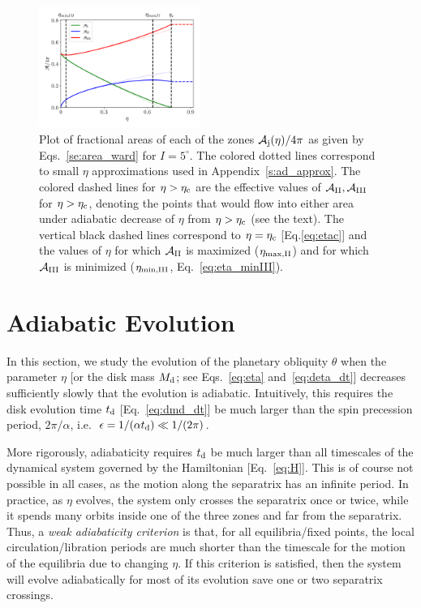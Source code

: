 \documentclass[twocolumn,twocolappendix]{aastex63}
\begin{document}
\begin{figure}
    \centering
    \includegraphics[width=0.47\textwidth]{plots_diskdisp/1_areas.png}
    \caption{Plot of fractional areas of each of the zones
    $\mathcal{A}_{\rm j}(\eta) / 4\pi$ as given by Eqs.~\eqref{se:area_ward}
    for $I = 5^\circ$. The colored dotted lines correspond to
    small $\eta$ approximations used in Appendix~\ref{s:ad_approx}. The colored
    dashed lines for $\eta > \eta_{\rm c}$ are the effective values of
    $\mathcal{A}_{\rm II}, \mathcal{A}_{\rm III}$ for $\eta > \eta_{\rm c}$,
    denoting the points that would flow into either area under adiabatic
    decrease of $\eta$ from $\eta > \eta_{\rm c}$ (see the text). The vertical
    black dashed lines correspond to $\eta = \eta_{\rm c}$ [Eq.\eqref{eq:etac}]
    and the values of $\eta$ for which $\mathcal{A}_{\rm II}$ is maximized
    ($\eta_{\rm \max, II}$) and for which $\mathcal{A}_{\rm III}$ is minimized
    ($\eta_{\rm \min, III}$, Eq.~\eqref{eq:eta_minIII}).}\label{fig:eq_areas}
\end{figure}

\section{Adiabatic Evolution}\label{s:ad}

In this section, we study the evolution of the planetary obliquity $\theta$ when
the parameter $\eta$ [or the disk mass $M_{\rm d}$; see Eqs.~\eqref{eq:eta}
and~\eqref{eq:deta_dt}] decreases sufficiently slowly that the evolution is
adiabatic. Intuitively, this requires the disk evolution time
$t_{\rm d}$ [Eq.~\eqref{eq:dmd_dt}] be much larger than the spin precession
period, $2\pi / \alpha$, i.e.\ $\epsilon = 1 / (\alpha t_{\rm d}) \ll 1/
(2\pi)$.

More rigorously, adiabaticity requires $t_{\rm d}$ be much larger than all
timescales of the dynamical system governed by the Hamiltonian
[Eq.~\eqref{eq:H}]. This is of course not possible in all cases, as the motion
along the separatrix has an infinite period. In practice, as $\eta$ evolves, the
system only crosses the separatrix once or twice, while it spends many orbits
inside one of the three zones and far from the separatrix. Thus, a \emph{weak
adiabaticity criterion} is that, for all equilibria/fixed points, the local
circulation/libration periods are much shorter than the timescale for the motion
of the equilibria due to changing $\eta$. If this criterion is satisfied, then
the system will evolve adiabatically for most of its evolution save one or two
separatrix crossings.
\end{document}
